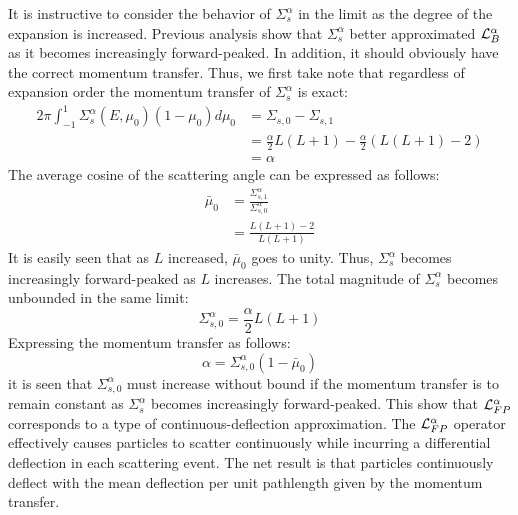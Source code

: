 It is instructive to consider the behavior of $\Sigma_s^{\alpha}$ in the limit
as the degree of the expansion is increased. Previous analysis show that
$\Sigma_s^{\alpha}$ better approximated $\mathcal{L}_B^{\alpha}$ as it becomes
increasingly forward-peaked. In addition, it should obviously have the correct
momentum transfer. Thus, we first take note that regardless of expansion order
the momentum transfer of $\Sigma_s^{\alpha}$ is exact:
\begin{equation}
\begin{split}
2\pi \int_{-1}^1 \Sigma_s^{\alpha}(E,\mu_0) (1-\mu_0) d\mu_0 &=
\Sigma_{s,0}-\Sigma_{s,1}\\
&=\frac{\alpha}{2} L(L+1) - \frac{\alpha}{2} (L(L+1)-2)\\
&=\alpha
\end{split}
\end{equation}
The average cosine of the scattering angle can be expressed as follows:
\begin{equation}
\begin{split}
\bar{\mu}_0 &= \frac{\Sigma_{s,1}^{\alpha}}{\Sigma_{s,0}^{\alpha}}\\
&=\frac{L(L+1)-2}{L(L+1)}
\end{split}
\end{equation}
It is easily seen that as $L$ increased, $\bar{\mu}_0$ goes to unity. Thus,
$\Sigma_s^{\alpha}$ becomes increasingly forward-peaked as $L$ increases. The
total magnitude of $\Sigma_s^{\alpha}$ becomes unbounded in the same limit:
\begin{equation}
\Sigma_{s,0}^{\alpha} = \frac{\alpha}{2} L (L+1)
\end{equation}
Expressing the momentum transfer as follows:
\begin{equation}
\alpha = \Sigma_{s,0}^{\alpha} (1-\bar{\mu}_0)
\end{equation}
it is seen that $\Sigma_{s,0}^{\alpha}$ must increase without bound if the
momentum transfer is to remain constant as $\Sigma_s^{\alpha}$ becomes
increasingly forward-peaked. This show that $\mathcal{L}_{FP}^{\alpha}$ corresponds
to a type of continuous-deflection approximation. The $\mathcal{L}_{FP}^{\alpha}$
operator effectively causes particles to scatter continuously while incurring
a differential deflection in each scattering event. The net result is that
particles continuously deflect with the mean deflection per unit pathlength
given by the momentum transfer.


